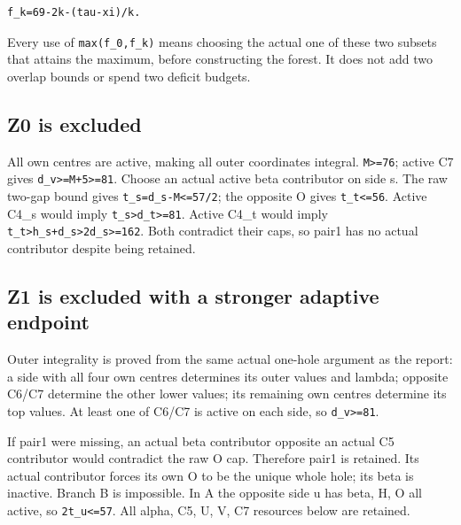 \documentclass[10pt,a4paper]{article}
\theoremstyle{definition}
\begin{document}
\begin{lstlisting}
f_k=69-2k-(tau-xi)/k.
\end{lstlisting}

Every use of \texttt{max(f\_\allowbreak{}\allowbreak{}0,\allowbreak{}f\_\allowbreak{}\allowbreak{}k)} means choosing the
actual one of these two subsets that attains the maximum,\allowbreak{} before
constructing the forest. It does not add two overlap bounds or spend two
deficit budgets.

\hypertarget{z0-is-excluded}{%
\subsection{Z0 is excluded}\label{z0-is-excluded}}

All own centres are active,\allowbreak{} making all outer coordinates integral.
\texttt{M>=\allowbreak{}76}; active C7 gives
\texttt{d\_\allowbreak{}\allowbreak{}v>=\allowbreak{}M+\allowbreak{}5>=\allowbreak{}81}. Choose an actual active beta
contributor on side s. The raw two-gap bound gives
\texttt{t\_\allowbreak{}\allowbreak{}s=\allowbreak{}d\_\allowbreak{}\allowbreak{}s-M<=\allowbreak{}57/\allowbreak{}2}; the opposite O gives
\texttt{t\_\allowbreak{}\allowbreak{}t<=\allowbreak{}56}. Active C4\_\allowbreak{}s would imply
\texttt{t\_\allowbreak{}\allowbreak{}s>d\_\allowbreak{}\allowbreak{}t>=\allowbreak{}81}. Active C4\_\allowbreak{}t would imply
\texttt{t\_\allowbreak{}\allowbreak{}t>h\_\allowbreak{}\allowbreak{}s+\allowbreak{}d\_\allowbreak{}\allowbreak{}s>2d\_\allowbreak{}\allowbreak{}s>=\allowbreak{}162}. Both contradict
their caps,\allowbreak{} so pair1 has no actual contributor despite being retained.

\hypertarget{z1-is-excluded-with-a-stronger-adaptive-endpoint}{%
\subsection{Z1 is excluded with a stronger adaptive
endpoint}\label{z1-is-excluded-with-a-stronger-adaptive-endpoint}}

Outer integrality is proved from the same actual one-hole argument as
the report: a side with all four own centres determines its outer values
and lambda; opposite C6/C7 determine the other lower values; its
remaining own centres determine its top values. At least one of C6/C7 is
active on each side,\allowbreak{} so \texttt{d\_\allowbreak{}\allowbreak{}v>=\allowbreak{}81}.

If pair1 were missing,\allowbreak{} an actual beta contributor opposite an actual C5
contributor would contradict the raw O cap. Therefore pair1 is retained.
Its actual contributor forces its own O to be the unique whole hole; its
beta is inactive. Branch B is impossible. In A the opposite side u has
beta,\allowbreak{} H,\allowbreak{} O all active,\allowbreak{} so \texttt{2t\_\allowbreak{}\allowbreak{}u<=\allowbreak{}57}. All
alpha,\allowbreak{} C5,\allowbreak{} U,\allowbreak{} V,\allowbreak{} C7 resources below are retained.
\end{document}
